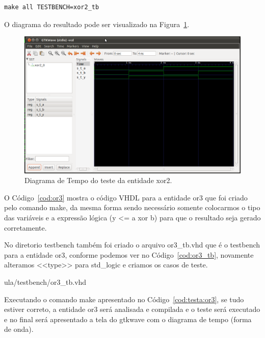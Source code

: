 \documentclass[a4paper,11pt]{report}
\begin{document}
\lstset{numbers=left, numberstyle=\tiny, stepnumber=1, numbersep=3pt}
\begin{lstlisting}[label=cod:testa:xor2,caption=Comando para executar o testbench da entidade xor2.]
  make all TESTBENCH=xor2_tb
\end{lstlisting}

O diagrama do resultado pode ser visualizado na Figura~\ref{fig:gtw:xor2}.

\begin{figure}[H]
\centering
\includegraphics[width=1\textwidth]{figuras/gtw_xor2.png}
\caption{Diagrama de Tempo do teste da entidade xor2.}
\label{fig:gtw:xor2}
\end{figure}

O Código~\ref{cod:or3} mostra o código VHDL para a entidade or3 que foi criado pelo comando make, da mesma forma sendo necessário somente colocarmos o tipo das variáveis e a expressão lógica (y <= a xor b) para que o resultado seja gerado corretamente.

\lstset{language=VHDL}
\lstset{numbers=left, numberstyle=\tiny, stepnumber=1, numbersep=3pt}


No diretorio testbench também foi criado o arquivo or3\_tb.vhd que é o testbench para a entidade or3, conforme podemos ver no Código~\ref{cod:or3_tb}, novamente alteramos <<type>> para std\_logic e criamos os casos de teste.

\lstset{language=VHDL}
\lstset{numbers=left, numberstyle=\tiny, stepnumber=1, numbersep=3pt}
 {ula/testbench/or3_tb.vhd}

Executando o comando make apresentado no Código~\ref{cod:testa:or3}, se tudo estiver correto, a entidade or3 será analisada e compilada e o teste será executado e no final será apresentado a tela do gtkwave com o diagrama de tempo (forma de onda).
\end{document}
